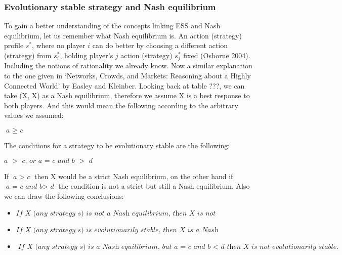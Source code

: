 \documentclass{article}
\begin{document}
\subsubsection{Evolutionary stable strategy and Nash equilibrium}
To gain a better understanding of the concepts linking ESS and Nash equilibrium, let us remember what Nash equilibrium is.
An action (strategy) profile $s^*$, where no player $\textit{i}$ can do better by choosing a different action (strategy) from $s^*_i$, holding player’s $\textit{j}$ action (strategy) $s^*_{j}$ fixed (Osborne 2004).  Including the notions of rationality we already know.
Now a similar explanation to the one given in ‘Networks, Crowds, and Markets: Reasoning about a Highly Connected World’ by Easley and Kleinber.
Looking back at table ???, we can take (X, X) as a Nash equilibrium, therefore we assume X is a best response to both players. And this would mean the following according to the arbitrary values we assumed:
\begin{center}
$\textit{a $\geq$ c}$
\end{center}
The conditions for a strategy to be evolutionary stable are the following:
\begin{center}
$\textit{a $>$ c, or a = c and b $>$ d}$
\end{center}
If $\textit{a $>$ c}$ then X would be a strict Nash equilibrium, on the other hand if $\textit{a = c and b$>$ d}$ the condition is not a strict but still a Nash equilibrium. Also we can draw the following conclusions:

\begin{itemize}
\item $\textit{If X (any strategy s) is not a Nash equilibrium, then X is not evolutionarily stable.}$
\item $\textit{If X (any strategy s) is evolutionarily stable, then X is a Nash equilibrium.}$
\item $\textit{If X (any strategy s) is a Nash equilibrium, but  $\textit{a = c and b $<$ d}$ then X is not evolutionarily stable.}$
\end{itemize}
\end{document}
